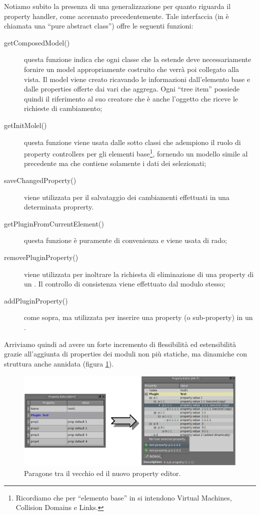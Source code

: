 Notiamo subito la presenza di una generalizzazione per quanto riguarda il property handler, come accennato precedentemente. Tale interfaccia (in \cpp{} è chiamata una ``pure abstract class'') offre le seguenti funzioni:
\begin{description}
\item[getComposedModel()]questa funzione indica che ogni classe che la estende deve necessariamente fornire un model appropriamente costruito che verrà poi collegato alla vista. Il model viene creato ricavando le informazioni dall'elemento base e dalle properties offerte dai vari \plugin{} che aggrega. Ogni ``tree item'' possiede quindi il riferimento al suo creatore che è anche l'oggetto che riceve le richieste di cambiamento;

\item[getInitMolel()]questa funzione viene usata dalle sotto classi che adempiono il ruolo di property controllers per gli elementi base\footnote{Ricordiamo che per ``elemento base'' in \visualnetkit{} si intendono Virtual Machines, Collision Domains e Links.}, fornendo un modello simile al precedente ma che contiene solamente i dati dei \plugin{} selezionati;

\item[saveChangedProperty()]viene utilizzata per il salvataggio dei cambiamenti effettuati in una determinata proprerty.

\item[getPluginFromCurrentElement()]questa funzione è puramente di convenienza e viene usata di rado;

\item[removePluginProperty()]viene utilizzata per inoltrare la richiesta di eliminazione di una property di un \plugin{}. Il controllo di consistenza viene effettuato dal modulo stesso;

\item[addPluginProperty()]come sopra, ma utilizzata per inserire una property (o sub-property) in un \plugin{}.
\end{description}

Arriviamo quindi ad avere un forte incremento di flessibilità ed estensibilità grazie all'aggiunta di properties dei moduli non più statiche, ma dinamiche con struttura anche annidata (figura \ref{figura:property_editor_paragone}).

\begin{figure}[!htb]
	\centering
	\includegraphics[width=12cm]{images/property_editors_paragone.png}
	\caption{Paragone tra il vecchio ed il nuovo property editor.}
	\label{figura:property_editor_paragone}
\end{figure}


